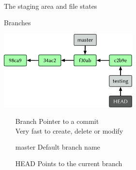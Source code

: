 \documentclass{beamer}
\begin{document}
\begin{frame}{The staging area and file states}
  \begin{center}
  \end{center}
\end{frame}

\begin{frame}{Branches}
  \begin{center}
    \includegraphics[height=4cm]{images/fig0307.pdf}
  \end{center}
  \begin{itemize}
  \item[Branch] Pointer to a commit\\Very fast to create, delete or modify
  \item[master] Default branch name
  \item[HEAD] Points to the current branch
  \end{itemize}
\end{frame}
\end{document}
